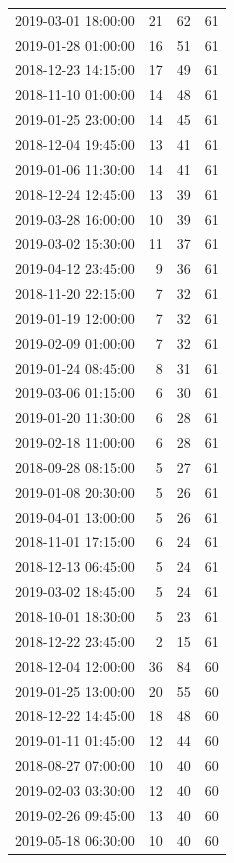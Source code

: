 \begin{tabular}{lrrr}
2019-03-01 18:00:00 & 21 & 62 & 61 \\
2019-01-28 01:00:00 & 16 & 51 & 61 \\
2018-12-23 14:15:00 & 17 & 49 & 61 \\
2018-11-10 01:00:00 & 14 & 48 & 61 \\
2019-01-25 23:00:00 & 14 & 45 & 61 \\
2018-12-04 19:45:00 & 13 & 41 & 61 \\
2019-01-06 11:30:00 & 14 & 41 & 61 \\
2018-12-24 12:45:00 & 13 & 39 & 61 \\
2019-03-28 16:00:00 & 10 & 39 & 61 \\
2019-03-02 15:30:00 & 11 & 37 & 61 \\
2019-04-12 23:45:00 & 9 & 36 & 61 \\
2018-11-20 22:15:00 & 7 & 32 & 61 \\
2019-01-19 12:00:00 & 7 & 32 & 61 \\
2019-02-09 01:00:00 & 7 & 32 & 61 \\
2019-01-24 08:45:00 & 8 & 31 & 61 \\
2019-03-06 01:15:00 & 6 & 30 & 61 \\
2019-01-20 11:30:00 & 6 & 28 & 61 \\
2019-02-18 11:00:00 & 6 & 28 & 61 \\
2018-09-28 08:15:00 & 5 & 27 & 61 \\
2019-01-08 20:30:00 & 5 & 26 & 61 \\
2019-04-01 13:00:00 & 5 & 26 & 61 \\
2018-11-01 17:15:00 & 6 & 24 & 61 \\
2018-12-13 06:45:00 & 5 & 24 & 61 \\
2019-03-02 18:45:00 & 5 & 24 & 61 \\
2018-10-01 18:30:00 & 5 & 23 & 61 \\
2018-12-22 23:45:00 & 2 & 15 & 61 \\
2018-12-04 12:00:00 & 36 & 84 & 60 \\
2019-01-25 13:00:00 & 20 & 55 & 60 \\
2018-12-22 14:45:00 & 18 & 48 & 60 \\
2019-01-11 01:45:00 & 12 & 44 & 60 \\
2018-08-27 07:00:00 & 10 & 40 & 60 \\
2019-02-03 03:30:00 & 12 & 40 & 60 \\
2019-02-26 09:45:00 & 13 & 40 & 60 \\
2019-05-18 06:30:00 & 10 & 40 & 60 \\

\end{tabular}
